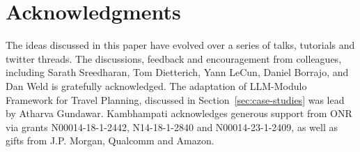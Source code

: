 \documentclass{article}
\theoremstyle{plain}
\theoremstyle{definition}
\theoremstyle{remark}
\begin{document}

\section*{Acknowledgments}
The ideas discussed in this paper have evolved over a series of talks, tutorials and twitter threads. The discussions, feedback and encouragement from colleagues, including Sarath Sreedharan, Tom Dietterich, %
Yann LeCun, Daniel Borrajo, and Dan Weld  
is gratefully acknowledged. 
%
The adaptation of LLM-Modulo Framework for Travel Planning, discussed in Section~\ref{sec:case-studies} was lead by Atharva Gundawar.
%
Kambhampati acknowledges generous support from ONR via grants N00014-18-1-2442, N14-18-1-2840 and N00014-23-1-2409, as well as gifts from J.P. Morgan, Qualcomm and Amazon.


%
%
\end{document}
